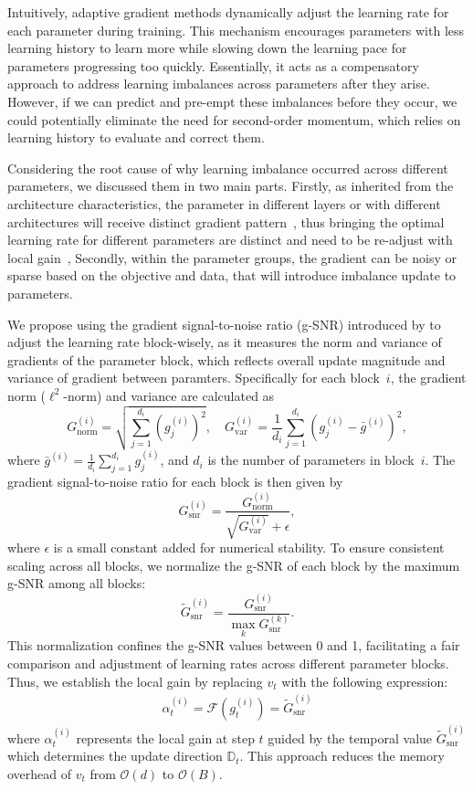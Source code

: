 Intuitively, adaptive gradient methods dynamically adjust the learning rate for each parameter during training. This mechanism encourages parameters with less learning history to learn more while slowing down the learning pace for parameters progressing too quickly. Essentially, it acts as a compensatory approach to address learning imbalances across parameters after they arise. However, if we can predict and pre-empt these imbalances before they occur, we could potentially eliminate the need for second-order momentum, which relies on learning history to evaluate and correct them. 

Considering the root cause of why learning imbalance occurred across different parameters, we discussed them in two main parts. Firstly, as inherited from the architecture characteristics, the parameter in different layers or with different architectures will receive distinct gradient pattern~\cite{tanaka2020pruning, lizico, xiang2023exploiting}, thus bringing the optimal learning rate for different parameters are distinct and need to be re-adjust with local gain~\cite{hinton2012neural}, Secondly, within the parameter groups, the gradient can be noisy or sparse based on the objective and data, that will introduce imbalance update to parameters.

We propose using the gradient signal-to-noise ratio (g-SNR) introduced by \cite{xiang2023exploiting} to adjust the learning rate block-wisely, as it measures the norm and variance of gradients of the parameter block, which reflects overall update magnitude and variance of gradient between paramters. Specifically for each block~$i$, the gradient norm ($\ell^2$-norm) and variance are calculated as
\[
G_{\text{norm}}^{(i)} = \sqrt{\sum_{j=1}^{d_i} \left( g^{(i)}_j \right)^2}, \quad G_{\text{var}}^{(i)} = \frac{1}{d_i} \sum_{j=1}^{d_i} \left( g^{(i)}_j - \bar{g}^{(i)} \right)^2,
\]
where $\bar{g}^{(i)} = \frac{1}{d_i} \sum_{j=1}^{d_i} g^{(i)}_j$, and $d_i$ is the number of parameters in block~$i$. The gradient signal-to-noise ratio for each block is then given by
\[
G_{\text{snr}}^{(i)} = \frac{G_{\text{norm}}^{(i)}}{\sqrt{G_{\text{var}}^{(i)}} + \epsilon},
\]
where $\epsilon$ is a small constant added for numerical stability. To ensure consistent scaling across all blocks, we normalize the g-SNR of each block by the maximum g-SNR among all blocks:
\[
\tilde{G}_{\text{snr}}^{(i)} = \frac{G_{\text{snr}}^{(i)}}{\max_{k} G_{\text{snr}}^{(k)}}.
\]
This normalization confines the g-SNR values between 0 and 1, facilitating a fair comparison and adjustment of learning rates across different parameter blocks. Thus, we establish the local gain by replacing $v_t$ with the following expression:
\begin{align*}
    \alpha^{(i)}_t = \mathcal{F}(g^{(i)}_t) = \tilde{G}_{\text{snr}}^{(i)}
\end{align*}
where $\alpha^{(i)}_t$ represents the local gain at step $t$ guided by the temporal value $\tilde{G}_{\text{snr}}^{(i)}$  which determines the update direction $\mathbb{D}_t$. This approach reduces the memory overhead of $v_t$ from $\mathcal{O}(d)$ to $\mathcal{O}(B)$. 

